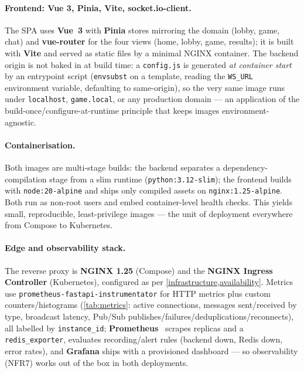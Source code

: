 \documentclass{scrartcl}
\begin{document}
\paragraph{Frontend: Vue 3, Pinia, Vite, socket.io-client.}
The SPA uses \textbf{Vue~3} with \textbf{Pinia} stores mirroring the
domain (lobby, game, chat) and \textbf{vue-router} for the four views
(home, lobby, game, results); it is built with \textbf{Vite} and served as
static files by a minimal NGINX container. The backend origin is not
baked in at build time: a \texttt{config.js} is generated \emph{at
container start} by an entrypoint script (\texttt{envsubst} on a
template, reading the \texttt{WS\_URL} environment variable, defaulting to
same-origin), so the very same image runs under \texttt{localhost},
\texttt{game.local}, or any production domain --- an application of the
build-once/configure-at-runtime principle that keeps images
environment-agnostic.

\paragraph{Containerisation.}
Both images are multi-stage builds: the backend separates a
dependency-compilation stage from a slim runtime
(\texttt{python:3.12-slim}); the frontend builds with
\texttt{node:20-alpine} and ships only compiled assets on
\texttt{nginx:1.25-alpine}. Both run as non-root users and embed
container-level health checks. This yields small, reproducible,
least-privilege images --- the unit of deployment everywhere from Compose
to Kubernetes.

\paragraph{Edge and observability stack.}
The reverse proxy is \textbf{NGINX 1.25} (Compose) and the
\textbf{NGINX Ingress Controller} (Kubernetes), configured as per
\cref{infrastructure,availability}. Metrics use
\texttt{prometheus-fastapi-instrumentator} for HTTP metrics plus custom
counters/histograms (\cref{tab:metrics}: active connections, messages
sent/received by type, broadcast latency, Pub/Sub
publishes/failures/deduplications/reconnects),
all labelled by \texttt{instance\_id}; \textbf{Prometheus}~\cite{prometheus}
scrapes replicas and a \texttt{redis\_exporter}, evaluates recording/alert
rules (backend down, Redis down, error rates), and \textbf{Grafana} ships
with a provisioned dashboard --- so observability (NFR7) works out of the
box in both deployments.
\end{document}

